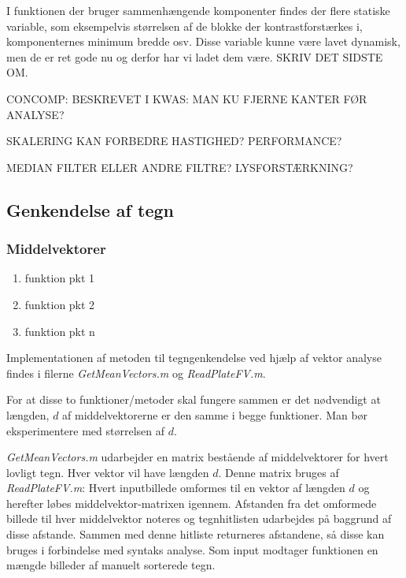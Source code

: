 I funktionen der bruger sammenhængende komponenter findes der flere statiske variable, som eksempelvis størrelsen af de blokke der kontrastforstærkes i, komponenternes minimum bredde osv. Disse variable kunne være lavet dynamisk, men de er ret gode nu og derfor har vi ladet dem være. SKRIV DET SIDSTE OM.

CONCOMP: BESKREVET I KWAS: MAN KU FJERNE KANTER FØR ANALYSE?

SKALERING KAN FORBEDRE HASTIGHED? PERFORMANCE?

MEDIAN FILTER ELLER ANDRE FILTRE? LYSFORSTÆRKNING?



\subsection{Genkendelse af tegn}

\subsubsection{Middelvektorer}

\begin{enumerate}
\item funktion pkt 1
\item funktion pkt 2
\item funktion pkt n
\end{enumerate}

Implementationen af metoden til tegngenkendelse ved hjælp af vektor analyse findes i filerne \textit{GetMeanVectors.m} og \textit{ReadPlateFV.m}.

For at disse to funktioner/metoder skal fungere sammen er det nødvendigt at længden, $d$ af middelvektorerne er den samme i begge funktioner. Man bør eksperimentere med størrelsen af $d$.

\textit{GetMeanVectors.m} udarbejder en matrix bestående af middelvektorer for hvert lovligt tegn. Hver vektor vil have længden $d$. Denne matrix bruges af \textit{ReadPlateFV.m}: Hvert inputbillede omformes til en vektor af længden $d$ og herefter løbes middelvektor-matrixen igennem. Afstanden fra det omformede billede til hver middelvektor noteres og tegnhitlisten udarbejdes på baggrund af disse afstande. Sammen med denne hitliste returneres afstandene, så disse kan bruges i forbindelse med syntaks analyse.
Som input modtager funktionen en mængde billeder af manuelt sorterede tegn.

